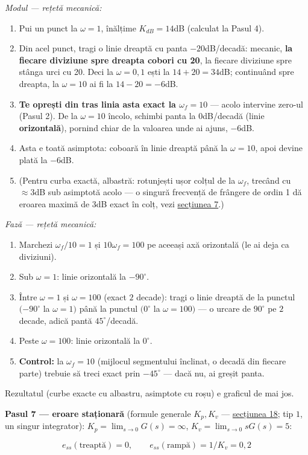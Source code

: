 \documentclass[10pt,a4paper]{article}
\newcommand{\tip}[1]{\textcolor{blue!55!black}{#1}}
\begin{document}
\textit{Modul — rețetă mecanică:}
\begin{enumerate}
\item Pui un punct la $\omega{=}1$, înălțime $K_{dB}{=}14$dB (calculat la Pasul 4).
\item Din acel punct, tragi o linie dreaptă cu panta $-20$dB/decadă: mecanic, \textbf{la fiecare diviziune spre dreapta cobori cu 20}, la fiecare diviziune spre stânga urci cu 20. Deci la $\omega{=}0{,}1$ ești la $14{+}20{=}34$dB; continuând spre dreapta, la $\omega{=}10$ ai fi la $14{-}20{=}{-}6$dB.
\item \textbf{Te oprești din tras linia asta exact la $\omega_f{=}10$} — acolo intervine zero-ul (Pasul 2). De la $\omega{=}10$ încolo, schimbi panta la $0$dB/decadă (linie \textbf{orizontală}), pornind chiar de la valoarea unde ai ajuns, $-6$dB.
\item Asta e toată asimptota: coboară în linie dreaptă până la $\omega{=}10$, apoi devine plată la $-6$dB.
\item (Pentru curba exactă, albastră: rotunjești ușor colțul de la $\omega_f$, trecând cu $\approx3$dB sub asimptotă acolo — o singură frecvență de frângere de ordin 1 dă eroarea maximă de $3$dB exact în colț, vezi \hyperref[sec:7]{secțiunea 7}.)
\end{enumerate}

\textit{Fază — rețetă mecanică:}
\begin{enumerate}
\item Marchezi $\omega_f/10{=}1$ și $10\omega_f{=}100$ pe aceeași axă orizontală (le ai deja ca diviziuni).
\item Sub $\omega{=}1$: linie orizontală la $-90^\circ$.
\item Între $\omega{=}1$ și $\omega{=}100$ (exact $2$ decade): tragi o linie dreaptă de la punctul $({-}90^\circ$ la $\omega{=}1)$ până la punctul $(0^\circ$ la $\omega{=}100)$ — o urcare de $90^\circ$ pe $2$ decade, adică pantă $45^\circ$/decadă.
\item Peste $\omega{=}100$: linie orizontală la $0^\circ$.
\item \tip{\textbf{Control:} la $\omega_f{=}10$ (mijlocul segmentului înclinat, o decadă din fiecare parte) trebuie să treci exact prin $-45^\circ$ — dacă nu, ai greșit panta.}
\end{enumerate}

Rezultatul (curbe exacte cu albastru, asimptote cu roșu) e graficul de mai jos.

\textbf{Pasul 7 — eroare staționară} (formule generale $K_p,K_v$ — \hyperref[sec:18]{secțiunea 18}; tip $1$, un singur integrator): $K_p{=}\lim_{s\to0}G(s){=}\infty$, $K_v{=}\lim_{s\to0}sG(s){=}5$:
\begin{keyeq}\color{red!65!black}
$$e_{ss}(\text{treaptă})=0,\qquad e_{ss}(\text{rampă})=1/K_v=0{,}2$$
\end{keyeq}
\end{document}
